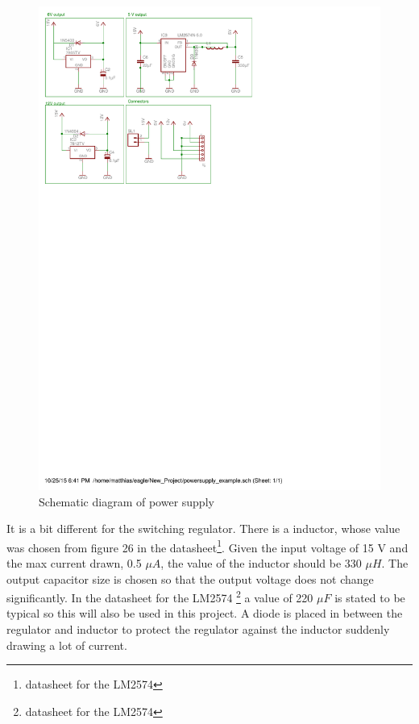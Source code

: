 \begin{figure}[H]
\includegraphics[scale=0.8,trim={0 19cm 0 0}]{img/powersupply.pdf}
\caption{Schematic diagram of power supply}
\label{fig::sch_power}
\end{figure}
It is a bit different for the switching regulator. There is a inductor, whose value was chosen from figure 26 in the datasheet\footnote{datasheet for the LM2574}. Given the input voltage of 15 V and the max current drawn, 0.5 $\mu A$, the value of the inductor should be 330 $\mu H$. The output capacitor size is chosen so that the output voltage does not change significantly. In the datasheet for the LM2574 \footnote{datasheet for the LM2574} a value of 220 $\mu F$ is stated to be typical so this will also be used in this project. A diode is placed in between the regulator and inductor to protect the regulator against the inductor suddenly drawing a lot of current.

